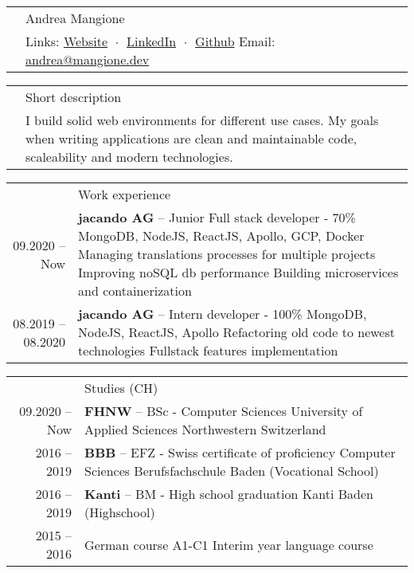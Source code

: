 \documentclass[letterpaper, 11pt]{article}
\newcommand{\header}{\Large\color{RedOrange}}
\newenvironment{SectionTable}[1]{
	\renewcommand*{\arraystretch}{1.7}
	\setlength{\tabcolsep}{10pt}
	\begin{longtable}{Rp{5.2in}} & #1 \\}
{\end{longtable}\vspace{-.3cm}}
\newenvironment{SectionTableSingleSpace}[1]{
	\renewcommand*{\arraystretch}{1.2}
	\setlength{\tabcolsep}{10pt}
	\begin{longtable}{Rp{5.2in}} & #1 \\[0.6em]}
{\end{longtable}\vspace{-.3cm}}
\begin{document}
\begin{SectionTable}{\Huge Andrea Mangione} & 
Links:
\href{https://andrea.mangione.dev}{Website}  $\;\boldsymbol{\cdot}\;$ 
\href{https://www.linkedin.com/in/andrea-mangione-592902156}{LinkedIn}  $\;\boldsymbol{\cdot}\;$ 
\href{https://github.com/MangioneAndrea}{Github}\newline
Email: 
\href{mailto:andrea@mangione.dev}{andrea@mangione.dev} 
\end{SectionTable}


\begin{SectionTable}{\header Short description}
&  I build solid web environments for different use cases. My goals when writing applications are clean and maintainable code, scaleability and modern technologies. 
\end{SectionTable}


\begin{SectionTable}{\header Work experience}
09.2020 -- Now & 
\textbf{jacando AG} -- Junior Full stack developer - 70\% \newline
MongoDB, NodeJS, ReactJS, Apollo, GCP, Docker \newline 
Managing translations processes for multiple projects \newline
Improving noSQL db performance\newline
Building microservices and containerization\newline\\

08.2019 -- 08.2020 & 
\textbf{jacando AG} -- Intern developer - 100\% \newline
MongoDB, NodeJS, ReactJS, Apollo \newline 
Refactoring old code to newest technologies\newline
Fullstack features implementation\\

\end{SectionTable}


\begin{SectionTableSingleSpace}{\header Studies (CH)}
09.2020 -- Now & 
\textbf{FHNW} -- BSc - Computer Sciences  \newline
University of Applied Sciences Northwestern Switzerland \\

2016 -- 2019 & 
\textbf{BBB} -- EFZ - Swiss certificate of proficiency Computer Sciences  \newline
Berufsfachschule Baden (Vocational School) \\
2016 -- 2019 & 
\textbf{Kanti} -- BM - High school graduation  \newline
Kanti Baden (Highschool) \\
2015 -- 2016 & 
German course A1-C1  \newline
Interim year language course \\

\end{SectionTableSingleSpace}
\end{document}
